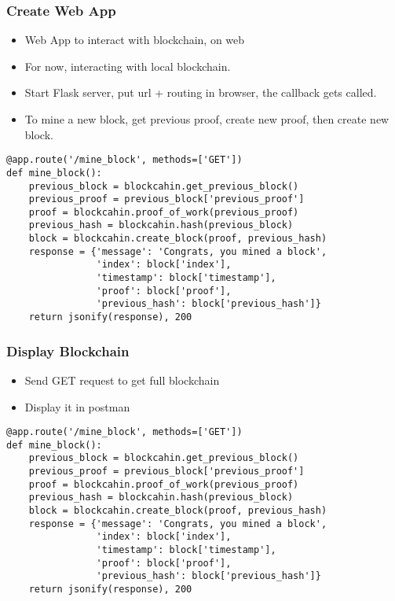 \begin{frame}[fragile]\frametitle{Create Web App}
\begin{itemize}
\item Web App to interact with blockchain, on web
\item For now, interacting with local blockchain.
\item Start Flask server, put url + routing in browser, the callback gets called.
\item To mine a new block, get previous proof, create new proof, then create new block.
\end{itemize}

\begin{lstlisting}
@app.route('/mine_block', methods=['GET'])
def mine_block():
    previous_block = blockcahin.get_previous_block()
    previous_proof = previous_block['previous_proof']
    proof = blockcahin.proof_of_work(previous_proof)
    previous_hash = blockcahin.hash(previous_block)
    block = blockcahin.create_block(proof, previous_hash)
    response = {'message': 'Congrats, you mined a block',
                'index': block['index'],
                'timestamp': block['timestamp'],
                'proof': block['proof'],
                'previous_hash': block['previous_hash']}
    return jsonify(response), 200
\end{lstlisting}
\end{frame}

\begin{frame}[fragile]\frametitle{Display Blockchain}
\begin{itemize}
\item Send GET request to get full blockchain
\item Display it in postman
\end{itemize}

\begin{lstlisting}
@app.route('/mine_block', methods=['GET'])
def mine_block():
    previous_block = blockcahin.get_previous_block()
    previous_proof = previous_block['previous_proof']
    proof = blockcahin.proof_of_work(previous_proof)
    previous_hash = blockcahin.hash(previous_block)
    block = blockcahin.create_block(proof, previous_hash)
    response = {'message': 'Congrats, you mined a block',
                'index': block['index'],
                'timestamp': block['timestamp'],
                'proof': block['proof'],
                'previous_hash': block['previous_hash']}
    return jsonify(response), 200
\end{lstlisting}
\end{frame}

